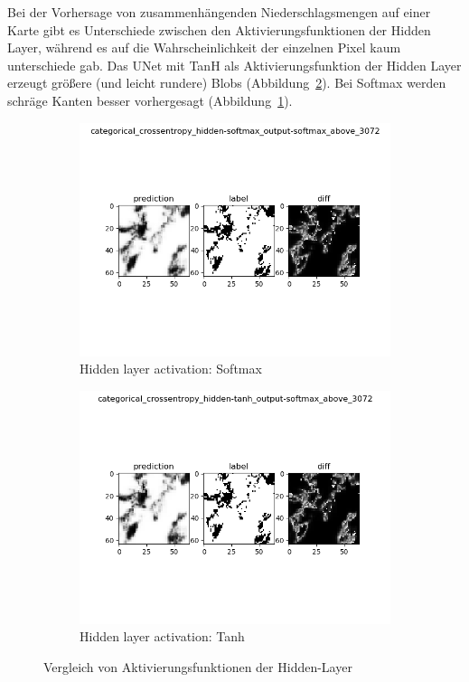 Bei der Vorhersage von zusammenhängenden Niederschlagsmengen auf einer Karte gibt es Unterschiede zwischen den Aktivierungsfunktionen der Hidden Layer, während es auf die Wahrscheinlichkeit der einzelnen Pixel kaum unterschiede gab.
Das UNet mit TanH als Aktivierungsfunktion der Hidden Layer erzeugt größere (und leicht rundere) Blobs (Abbildung~\ref{fig:hiddenActivationTanh}). Bei Softmax werden schräge Kanten besser vorhergesagt (Abbildung~\ref{fig:hiddenActivationSoftmax}).
\begin{figure}[ht]
\centering
\begin{subfigure}{0.5\textwidth}
\centering
\includegraphics[width=\linewidth]{pics/categorical_crossentropy_hidden-softmax_output-softmax_above_3072}
\caption{Hidden layer activation: Softmax}
\label{fig:hiddenActivationSoftmax}
\end{subfigure}%
\begin{subfigure}{0.5\textwidth}
\centering
\includegraphics[width=\linewidth]{pics/categorical_crossentropy_hidden-tanh_output-softmax_above_3072}
\caption{Hidden layer activation: Tanh}
\label{fig:hiddenActivationTanh}
\end{subfigure}%
\caption{Vergleich von Aktivierungsfunktionen der Hidden-Layer}
\label{fig:activatinHidden}
\end{figure}


